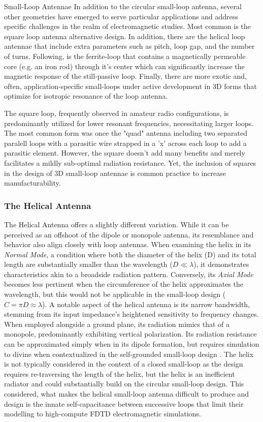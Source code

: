 \documentclass[12pt]{article}
\begin{document}
\begin{section} {Small-Loop Antennae}
In addition to the circular small-loop antenna, several other geometries have emerged to serve particular applications and address specific challenges in the realm of electromagnetic studies.  Most common is the square loop antenna alternative design.  In addition, there are the helical loop antennae that include extra parameters such as pitch, loop gap, and the number of turns.  Following, is the ferrite-loop that contains a magnetically permeable core (e.g. an iron rod) through it's center which can significantly increase the magnetic response of the still-passive loop. Finally, there are more exotic and, often, application-specific small-loops under active development in 3D forms that optimize for isotropic resonance of the loop antenna.

The square loop, frequently observed in amateur radio configurations, is predominantly utilized for lower resonant frequencies, necessitating larger loops. The most common form was once the "quad" antenna including two separated paralell loops with a parasitic wire strapped in a 'x' across each loop to add a parasitic element. However, the square doesn't add many benefits and merely facilitates a mildly sub-optimal radiation resistance. Yet, the inclusion of squares in the design of 3D small-loop antennae is common practice to increase manufacturability.

\subsubsection{The Helical Antenna}

The Helical Antenna offers a slightly different variation. While it can be perceived as an offshoot of the dipole or monopole antenna, its resemblance and behavior also align closely with loop antennas. When examining the helix in its \textit{Normal Mode}, a condition where both the diameter of the helix (D) and its total length are substantially smaller than the wavelength (\(D \ll \lambda\)), it demonstrates characteristics akin to a broadside radiation pattern. Conversely, its \textit{Axial Mode} becomes less pertinent when the circumference of the helix approximates the wavelength, but this would not be applicable in the small-loop design (\(C = \pi D \approx \lambda\)). A notable aspect of the helical antenna is its narrow bandwidth, stemming from its input impedance's heightened sensitivity to frequency changes. When employed alongside a ground plane, its radiation mimics that of a monopole, predominantly exhibiting vertical polarization. Its radiation resistance can be approximated simply when in its dipole formation, but requires simulation to divine when contextualized in the self-grounded small-loop design  \cite{huang_antennas_2021}. The helix is not typically considered in the context of a closed small-loop as the design requires re-traversing the length of the helix, but the helix is an inefficient radiator and could substantially build on the circular small-loop design. This considered, what makes the helical small-loop antenna difficult to produce and design is the innate self-capacitance between successive loops that limit their modelling to high-compute FDTD electromagnetic simulations.


\end{section}
\end{document}
